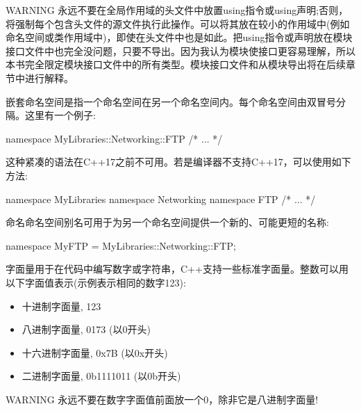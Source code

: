\begin{myWarning}{WARNING}
永远不要在全局作用域的头文件中放置using指令或using声明;否则，将强制每个包含头文件的源文件执行此操作。可以将其放在较小的作用域中(例如命名空间或类作用域中)，即使在头文件中也是如此。把using指令或声明放在模块接口文件中也完全没问题，只要不导出。因为我认为模块使接口更容易理解，所以本书完全限定模块接口文件中的所有类型。模块接口文件和从模块导出将在后续章节中进行解释。
\end{myWarning}


嵌套命名空间是指一个命名空间在另一个命名空间内。每个命名空间由双冒号分隔。这里有一个例子:

\begin{cpp}
namespace MyLibraries::Networking::FTP {
    /* ... */
}
\end{cpp}

这种紧凑的语法在C++17之前不可用。若是编译器不支持C++17，可以使用如下方法:

\begin{cpp}
namespace MyLibraries {
    namespace Networking {
        namespace FTP {
            /* ... */
        }
    }
}
\end{cpp}


命名命名空间别名可用于为另一个命名空间提供一个新的、可能更短的名称:

\begin{cpp}
namespace MyFTP = MyLibraries::Networking::FTP;
\end{cpp}


字面量用于在代码中编写数字或字符串，C++支持一些标准字面量。整数可以用以下字面值表示(示例表示相同的数字123):

\begin{itemize}
\item
十进制字面量, 123

\item
八进制字面量, 0173 (以0开头)

\item
十六进制字面量, 0x7B (以0x开头)

\item
二进制字面量, 0b1111011 (以0b开头)
\end{itemize}

\begin{myWarning}{WARNING}
永远不要在数字字面值前面放一个0，除非它是八进制字面量!
\end{myWarning}

